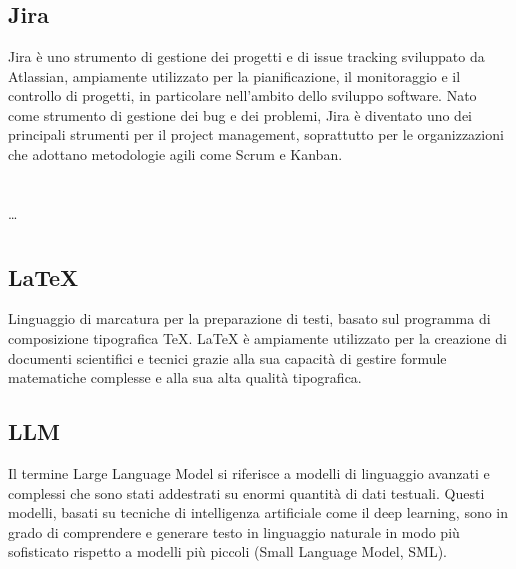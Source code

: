 
\section{}

\subsection*{Jira}
Jira è uno strumento di gestione dei progetti e di issue tracking sviluppato da Atlassian, ampiamente utilizzato per la pianificazione, il monitoraggio e 
il controllo di progetti, in particolare nell'ambito dello sviluppo software. Nato come strumento di gestione dei bug e dei problemi, Jira è diventato uno 
dei principali strumenti per il project management, soprattutto per le organizzazioni che adottano metodologie agili come Scrum e Kanban.

\newpage



\section{}

\dots

\newpage



\section{}

\subsection*{\LaTeX}
Linguaggio di marcatura per la preparazione di testi, basato sul programma di composizione tipografica TeX. LaTeX è ampiamente utilizzato per la creazione 
di documenti scientifici e tecnici grazie alla sua capacità di gestire formule matematiche complesse e alla sua alta qualità tipografica.

\hypertarget{sec:LLM}{}
\subsection*{LLM}
Il termine Large Language Model si riferisce a modelli di linguaggio avanzati e complessi che sono stati addestrati su enormi quantità di dati testuali. 
Questi modelli, basati su tecniche di intelligenza artificiale come il deep learning, sono in grado di comprendere e generare testo in linguaggio naturale 
in modo più sofisticato rispetto a modelli più piccoli (Small Language Model, SML).

\newpage